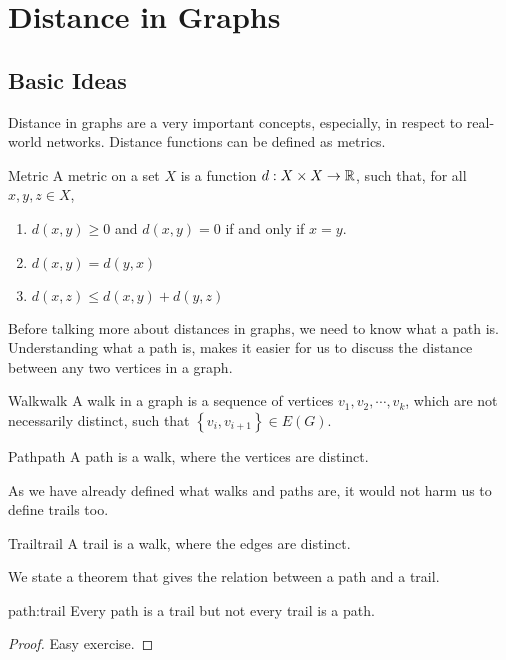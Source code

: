 \documentclass[../basic_graph_theory.tex]{subfiles}
\begin{document}
\chapter{Distance in Graphs}
\setcounter{chapter}{2} %
\setcounter{section}{0}
\setcounter{equation}{0}
\setcounter{figure}{0}

\section{Basic Ideas}
Distance in graphs are a very important concepts, especially, in respect to real-world networks. Distance functions can be defined as metrics.

\begin{Def}{Metric}{}
  A metric on a set $X$ is a function $d:X \times X \rightarrow \mathbb{R}$, such that, for all $x,y,z \in X$,
  \begin{enumerate}
    \item $d(x,y) \ge 0$ and $d(x,y)=0$ if and only if $x=y$.
    \item $d(x,y)=d(y,x)$
    \item $d(x,z) \le d(x,y)+d(y,z)$
  \end{enumerate}
\end{Def}

Before talking more about distances in graphs, we need to know what a path is. Understanding what a path is, makes it easier for us to discuss the distance between any two vertices in a graph.

\begin{Def}{Walk}{walk}
  A walk in a graph is a sequence of vertices $v_1, v_2,\cdots, v_k$, which are not necessarily distinct, such that $\left\{ v_i, v_{i+1} \right\} \in E(G)$.
\end{Def}

\begin{Def}{Path}{path}
  A path is a walk, where the vertices are distinct.
\end{Def}

As we have already defined what walks and paths are, it would not harm us to define trails too.

\begin{Def}{Trail}{trail}
  A trail is a walk, where the edges are distinct.
\end{Def}

We state a theorem that gives the relation between a path and a trail.

\begin{Thm}{}{path:trail}
  Every path is a trail but not every trail is a path.
\end{Thm}
\begin{proof}
  Easy exercise.
\end{proof}
\end{document}
